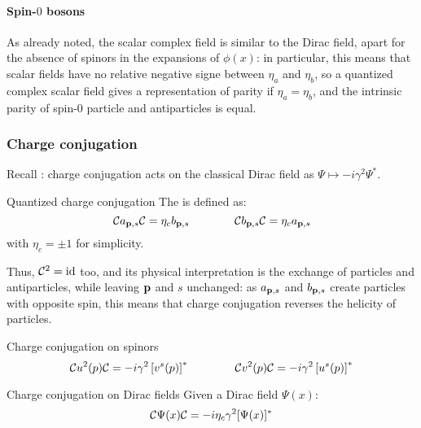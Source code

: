 \paragraph{Spin-$ 0 $ bosons}

As already noted, the scalar complex field is similar to the Dirac field, apart for the absence of spinors in the expansions of $ \phi(x) $: in particular, this means that scalar fields have no relative negative signe between $ \eta_a $ and $ \eta_b $, so a quantized complex scalar field gives a representation of parity if $ \eta_a = \eta_b $, and the intrinsic parity of spin-$ 0 $ particle and antiparticles is equal.

\subsubsection{Charge conjugation}

Recall : charge conjugation acts on the classical Dirac field as $ \Psi \mapsto -i \gamma^2 \Psi^* $.

\begin{definition}{Quantized charge conjugation}{}
  The  is defined as:
  \begin{equation}
    \mathcal{C} a_{\mathbf{p},s} \mathcal{C} = \eta_c b_{\mathbf{p},s}
    \qquad \qquad
    \mathcal{C} b_{\mathbf{p},s} \mathcal{C} = \eta_c a_{\mathbf{p},s}
    \label{eq:charge-conj-op}
  \end{equation}
  with $ \eta_c = \pm 1 $ for simplicity.
\end{definition}

Thus, $ \mathcal{C}^2 = \operatorname{id} $ too, and its physical interpretation is the exchange of particles and antiparticles, while leaving $ \mathbf{p} $ and $ s $ unchanged: as $ a_{\mathbf{p},s} $ and $ b_{\mathbf{p},s} $ create particles with opposite spin, this means that charge conjugation reverses the helicity of particles.

\begin{lemma}[before upper = {\tcbtitle}]{Charge conjugation on spinors}{}
  \begin{equation}
    \mathcal{C} u^2(p) \mathcal{C} = -i \gamma^2 \left[ v^s(p) \right]^*
    \qquad \qquad
    \mathcal{C} v^2(p) \mathcal{C} = -i \gamma^2 \left[ u^s(p) \right]^*
    \label{eq:charge-conj-spin}
  \end{equation}
\end{lemma}

\begin{proposition}{Charge conjugation on Dirac fields}{}
  Given a Dirac field $ \Psi(x) $:
  \begin{equation}
    \mathcal{C} \Psi(x) \mathcal{C} = -i \eta_c \gamma^2 [\Psi(x)]^*
  \end{equation}
\end{proposition}

